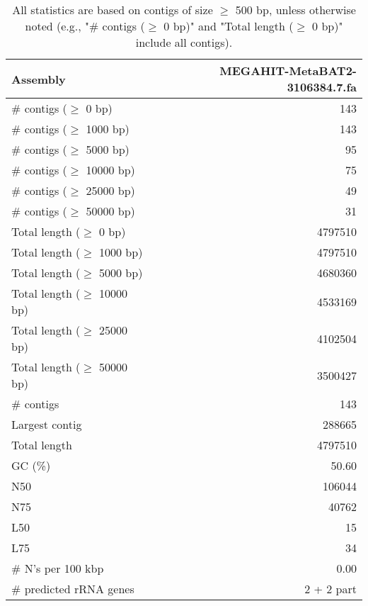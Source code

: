 \documentclass[12pt,a4paper]{article}
\begin{document}
\begin{table}[ht]
\begin{center}
\caption{All statistics are based on contigs of size $\geq$ 500 bp, unless otherwise noted (e.g., "\# contigs ($\geq$ 0 bp)" and "Total length ($\geq$ 0 bp)" include all contigs).}
\begin{tabular}{|l*{1}{|r}|}
\hline
Assembly & MEGAHIT-MetaBAT2-3106384.7.fa \\ \hline
\# contigs ($\geq$ 0 bp) & 143 \\ \hline
\# contigs ($\geq$ 1000 bp) & 143 \\ \hline
\# contigs ($\geq$ 5000 bp) & 95 \\ \hline
\# contigs ($\geq$ 10000 bp) & 75 \\ \hline
\# contigs ($\geq$ 25000 bp) & 49 \\ \hline
\# contigs ($\geq$ 50000 bp) & 31 \\ \hline
Total length ($\geq$ 0 bp) & 4797510 \\ \hline
Total length ($\geq$ 1000 bp) & 4797510 \\ \hline
Total length ($\geq$ 5000 bp) & 4680360 \\ \hline
Total length ($\geq$ 10000 bp) & 4533169 \\ \hline
Total length ($\geq$ 25000 bp) & 4102504 \\ \hline
Total length ($\geq$ 50000 bp) & 3500427 \\ \hline
\# contigs & 143 \\ \hline
Largest contig & 288665 \\ \hline
Total length & 4797510 \\ \hline
GC (\%) & 50.60 \\ \hline
N50 & 106044 \\ \hline
N75 & 40762 \\ \hline
L50 & 15 \\ \hline
L75 & 34 \\ \hline
\# N's per 100 kbp & 0.00 \\ \hline
\# predicted rRNA genes & 2 + 2 part \\ \hline
\end{tabular}
\end{center}
\end{table}
\end{document}
